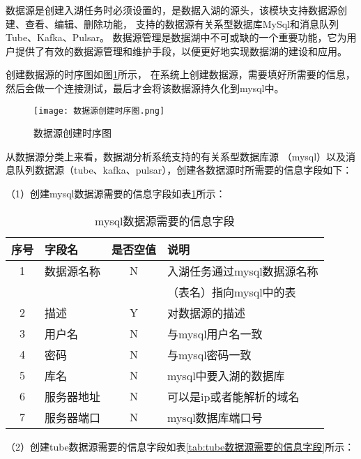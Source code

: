 数据源是创建入湖任务时必须设置的，是数据入湖的源头，该模块支持数据源创建、查看、编辑、删除功能，
支持的数据源有关系型数据库MySql和消息队列Tube、Kafka、Pulsar。
数据源管理是数据湖中不可或缺的一个重要功能，它为用户提供了有效的数据源管理和维护手段，以便更好地实现数据湖的建设和应用。

创建数据源的时序图如图\ref{fig:数据源创建时序图}所示，
在系统上创建数据源，需要填好所需要的信息，然后会做一个连接测试，最后才会将该数据源持久化到mysql中。

\begin{figure}[H]
  \centering
  \texttt{[image: 数据源创建时序图.png]}
  \caption{数据源创建时序图}
  \label{fig:数据源创建时序图}
\end{figure}

从数据源分类上来看，数据湖分析系统支持的有关系型数据库源
（mysql）以及消息队列数据源（tube、kafka、pulsar），创建各数据源时所需要的信息字段如下：

（1）创建mysql数据源需要的信息字段如表\ref{tab:mysql数据源需要的信息字段}所示：

\begin{table}[H]
  \centering
  \caption{mysql数据源需要的信息字段}
  \label{tab:mysql数据源需要的信息字段}
  \begin{tabular}{clcl}
    \toprule
    序号  & 字段名     & 是否空值   & 说明    \\
    \midrule
    1    & 数据源名称  & N        & 入湖任务通过mysql数据源名称  \\
         &           &          & （表名）指向mysql中的表      \\
    2    & 描述       & Y        & 对数据源的描述                                \\
    3    & 用户名     & N        & 与mysql用户名一致                             \\
    4    & 密码       & N        &  与mysql密码一致                             \\
    5    & 库名       & N        &   mysql中要入湖的数据库                       \\
    6    & 服务器地址  & N        &  可以是ip或者能解析的域名                      \\
    7    & 服务器端口  & N        &   mysql数据库端口号                          \\
    \bottomrule
  \end{tabular}
\end{table}

（2）创建tube数据源需要的信息字段如表\ref{tab:tube数据源需要的信息字段}所示：


